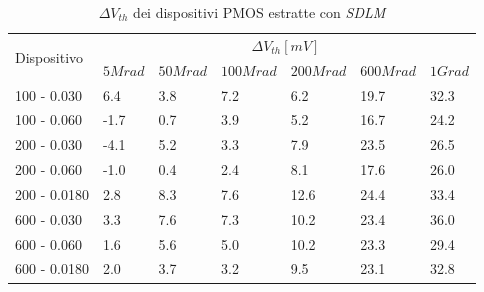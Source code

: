\documentclass[
	a4paper,
	cleardoublepage=empty,
	headings=twolinechapter,
	numbers=autoenddot,
]{scrbook}
\begin{document}
\begin{table}[H]
  \renewcommand{\arraystretch}{1.3}
  \begin{tabular}{m{2.1cm}  m{1.1cm} m{1.3cm} m{1.5cm} m{1.5cm} m{1.5cm} m{1cm}}
    \toprule
    \multirow{2}{*}{Dispositivo} & \multicolumn{6}{c}{$\Delta V_{th} [mV] $}                                                          \\
    \cmidrule{2-7}
                                 & $5Mrad$                                   & $50Mrad$ & $100Mrad$ & $200Mrad$ & $600Mrad$ & $1Grad$ \\
    \midrule
    100 - 0.030                     & 6.4                                       & 3.8      & 7.2       & 6.2       & 19.7      & 32.3    \\
    \hline
    100 - 0.060                     & -1.7                                      & 0.7      & 3.9       & 5.2       & 16.7      & 24.2    \\
    \hline
    200 - 0.030                     & -4.1                                      & 5.2      & 3.3       & 7.9       & 23.5      & 26.5    \\
    \hline
    200 - 0.060                     & -1.0                                      & 0.4      & 2.4       & 8.1       & 17.6      & 26.0    \\
    \hline
    200 - 0.0180                    & 2.8                                       & 8.3      & 7.6       & 12.6      & 24.4      & 33.4    \\
    \hline
    600 - 0.030                     & 3.3                                       & 7.6      & 7.3       & 10.2      & 23.4      & 36.0    \\
    \hline
    600 - 0.060                     & 1.6                                       & 5.6      & 5.0       & 10.2      & 23.3      & 29.4    \\
    \hline
    600 - 0.0180                    & 2.0                                       & 3.7      & 3.2       & 9.5       & 23.1      & 32.8    \\
    \bottomrule
  \end{tabular}
  \caption{$\Delta V_{th}$ dei dispositivi PMOS estratte con \emph{SDLM}}
  \label{tab:deltaVthSDLMP}
\end{table}
\end{document}
